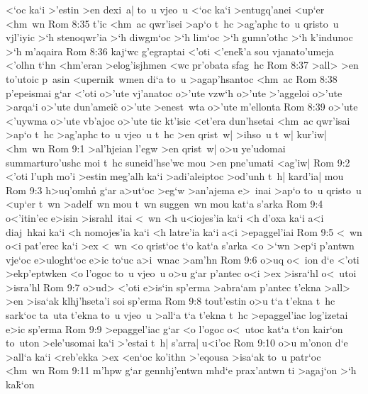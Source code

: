 <`oc
ka`i
>'estin
>en
dexi~a|
to~u
vjeo~u
<`oc
ka`i
>entugq'anei
<up`er
<hm~wn\bibvsend
\vs Rom 8:35
t'ic
<hm~ac
qwr'isei
>ap`o
t~hc
>ag'aphc
to~u
qristo~u
vjl'iyic
>`h
stenoqwr'ia
>`h
diwgm`oc
>`h
lim`oc
>`h
gumn'othc
>`h
k'indunoc
>`h
m'aqaira\bibvsend
\vs Rom 8:36
kaj`wc
g'egraptai
<'oti
<'ene\r{k}'a
sou
vjanato'umeja
<'olhn
t`hn
<hm'eran
>elog'isjhmen
<wc
pr'obata
sfag~hc\bibvsend
\vs Rom 8:37
>all>
>en
to'utoic
p~asin
<upernik~wmen
di`a
to~u
>agap'hsantoc
<hm~ac\bibvsend
\vs Rom 8:38
p'epeismai
g`ar
<'oti
o>'ute
vj'anatoc
o>'ute
vzw`h
o>'ute
>'aggeloi
o>'ute
>arqa`i
o>'ute
dun'ameic\r{}
o>'ute
>enest~wta
o>'ute
m'ellonta\bibvsend
\vs Rom 8:39
o>'ute
<'uywma
o>'ute
vb'ajoc
o>'ute
tic
kt'isic
<et'era
dun'hsetai
<hm~ac
qwr'isai
>ap`o
t~hc
>ag'aphc
to~u
vjeo~u
t~hc
>en
qrist~w|
>ihso~u
t~w|
kur'iw|
<hm~wn\bibvsend
\vs Rom 9:1
>al'hjeian
l'egw
>en
qrist~w|
o>u
ye'udomai
summarturo'ushc
moi
t~hc
suneid'hse'wc
mou
>en
pne'umati
<ag'iw|\bibvsend
\vs Rom 9:2
<'oti
l'uph
mo'i
>estin
meg'alh
ka`i
>adi'aleiptoc
>od'unh
t~h|
kard'ia|
mou\bibvsend
\vs Rom 9:3
h>uq'omhn\r{}
g`ar
a>ut`oc
>eg`w
>an'ajema
e>~inai
>ap`o
to~u
qristo~u
<up`er
t~wn
>adelf~wn
mou
t~wn
suggen~wn
mou
kat`a
s'arka\bibvsend
\vs Rom 9:4
o<'itin'ec
e>isin
>israhl~itai
<~wn
<h
u<iojes'ia
ka`i
<h
d'oxa
ka`i
a<i
diaj~hkai
ka`i
<h
nomojes'ia
ka`i
<h
latre'ia
ka`i
a<i
>epaggel'iai\bibvsend
\vs Rom 9:5
<~wn
o<i
pat'erec
ka`i
>ex
<~wn
<o
qrist`oc
t`o
kat`a
s'arka
<o
>`wn
>ep`i
p'antwn
vje`oc
e>uloght`oc
e>ic
to`uc
a>i~wnac
>am'hn\bibvsend
\vs Rom 9:6
o>uq
o<~ion
d`e
<'oti
>ekp'eptwken
<o
l'ogoc
to~u
vjeo~u
o>u
g`ar
p'antec
o<i
>ex
>isra`hl
o<~utoi
>isra'hl\bibvsend
\vs Rom 9:7
o>ud>
<'oti
e>is`in
sp'erma
>abra`am
p'antec
t'ekna
>all>
>en
>isa`ak
klhj'hseta'i
soi
sp'erma\bibvsend
\vs Rom 9:8
tou\r{t}'estin
o>u
t`a
t'ekna
t~hc
sark`oc
ta~uta
t'ekna
to~u
vjeo~u
>all`a
t`a
t'ekna
t~hc
>epaggel'iac
log'izetai
e>ic
sp'erma\bibvsend
\vs Rom 9:9
>epaggel'iac
g`ar
<o
l'ogoc
o<~utoc
kat`a
t`on
kair`on
to~uton
>ele'usomai
ka`i
>'estai
t~h|
s'arra|
u<i'oc\bibvsend
\vs Rom 9:10
o>u
m'onon
d`e
>all`a
ka`i
<reb'ekka
>ex
<en`oc
ko'ithn
>'eqousa
>isa`ak
to~u
patr`oc
<hm~wn\bibvsend
\vs Rom 9:11
m'hpw
g`ar
gennhj'entwn
mhd`e
prax'antwn
ti
>agaj`on
>`h
ka\r{k}`on
